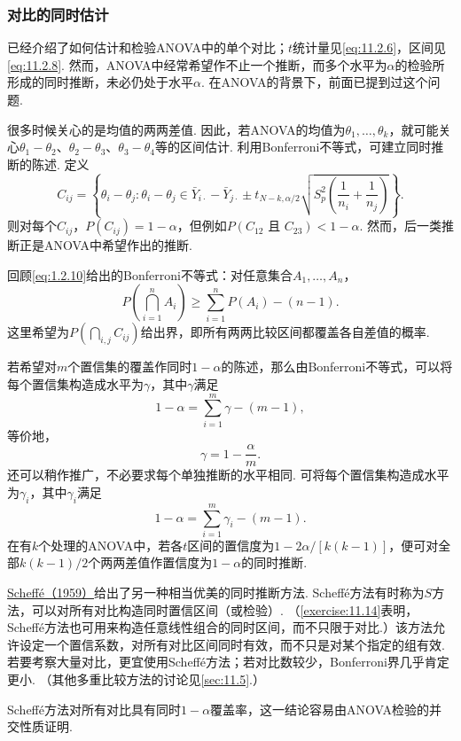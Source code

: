 \subsubsection{对比的同时估计}\label{sec:11.2.5}
已经介绍了如何估计和检验ANOVA中的单个对比；$t$统计量见\eqref{eq:11.2.6}，区间见\eqref{eq:11.2.8}. 然而，ANOVA中经常希望作不止一个推断，而多个水平为$\alpha$的检验所形成的同时推断，未必仍处于水平$\alpha$. 在ANOVA的背景下，前面已提到过这个问题.

\begin{example}[两两差值]\label{ex:11.2.9}
很多时候关心的是均值的两两差值. 因此，若ANOVA的均值为$\theta_1,\ldots,\theta_k$，就可能关心$\theta_1-\theta_2$、$\theta_2-\theta_3$、$\theta_3-\theta_4$等的区间估计. 利用Bonferroni不等式，可建立同时推断的陈述. 定义
$$C_{ij}=\left\{\theta_i-\theta_j:\theta_i-\theta_j\in\bar Y_{i\cdot}-\bar Y_{j\cdot}
\pm t_{N-k,\alpha/2}\sqrt{S_p^2\left(\frac1{n_i}+\frac1{n_j}\right)}\right\}.$$
则对每个$C_{ij}$，$P(C_{ij})=1-\alpha$，但例如$P(C_{12}\text{ 且 }C_{23})<1-\alpha$. 然而，后一类推断正是ANOVA中希望作出的推断.

回顾\eqref{eq:1.2.10}给出的Bonferroni不等式：对任意集合$A_1,\ldots,A_n$，
$$P\left(\bigcap_{i=1}^nA_i\right)\ge\sum_{i=1}^nP(A_i)-(n-1).$$
这里希望为$P(\bigcap_{i,j}C_{ij})$给出界，即所有两两比较区间都覆盖各自差值的概率.

若希望对$m$个置信集的覆盖作同时$1-\alpha$的陈述，那么由Bonferroni不等式，可以将每个置信集构造成水平为$\gamma$，其中$\gamma$满足
$$1-\alpha=\sum_{i=1}^m\gamma-(m-1),$$
等价地，
$$\gamma=1-\frac\alpha m.$$
还可以稍作推广，不必要求每个单独推断的水平相同. 可将每个置信集构造成水平为$\gamma_i$，其中$\gamma_i$满足
$$1-\alpha=\sum_{i=1}^m\gamma_i-(m-1).$$
在有$k$个处理的ANOVA中，若各$t$区间的置信度为$1-2\alpha/[k(k-1)]$，便可对全部$k(k-1)/2$个两两差值作置信度为$1-\alpha$的同时推断.
\end{example}

\hyperref[bib:source275]{Scheff\'e（1959）}给出了另一种相当优美的同时推断方法. Scheff\'e方法有时称为$S$方法，可以对所有对比构造同时置信区间（或检验）. （\autoref{exercise:11.14}表明，Scheff\'e方法也可用来构造任意线性组合的同时区间，而不只限于对比.）该方法允许设定一个置信系数，对所有对比区间同时有效，而不只是对某个指定的组有效. 若要考察大量对比，更宜使用Scheff\'e方法；若对比数较少，Bonferroni界几乎肯定更小. （其他多重比较方法的讨论见\autoref{sec:11.5}.）

Scheff\'e方法对所有对比具有同时$1-\alpha$覆盖率，这一结论容易由ANOVA检验的并交性质证明.

